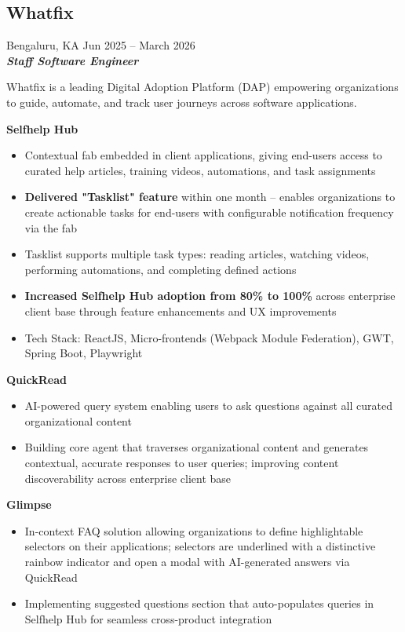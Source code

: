 \documentclass[10pt,a4paper]{article}
\begin{document}
\subsection*{\large Whatfix}
\textcolor{datecolor}{Bengaluru, KA \textbar Jun 2025 -- March 2026} \\
\textbf{\textit{Staff Software Engineer}}

Whatfix is a leading Digital Adoption Platform (DAP) empowering organizations to guide, automate, and track user journeys across software applications.

\textbf{Selfhelp Hub}
\begin{itemize}[leftmargin=*, nosep]
  \item Contextual fab embedded in client applications, giving end-users access to curated help articles, training videos, automations, and task assignments
  \item \textbf{Delivered "Tasklist" feature} within one month -- enables organizations to create actionable tasks for end-users with configurable notification frequency via the fab
  \item Tasklist supports multiple task types: reading articles, watching videos, performing automations, and completing defined actions
  \item \textbf{Increased Selfhelp Hub adoption from 80\% to 100\%} across enterprise client base through feature enhancements and UX improvements
  \item Tech Stack: ReactJS, Micro-frontends (Webpack Module Federation), GWT, Spring Boot, Playwright
\end{itemize}

\textbf{QuickRead}
\begin{itemize}[leftmargin=*, nosep]
  \item AI-powered query system enabling users to ask questions against all curated organizational content
  \item Building core agent that traverses organizational content and generates contextual, accurate responses to user queries; improving content discoverability across enterprise client base
\end{itemize}

\textbf{Glimpse}
\begin{itemize}[leftmargin=*, nosep]
  \item In-context FAQ solution allowing organizations to define highlightable selectors on their applications; selectors are underlined with a distinctive rainbow indicator and open a modal with AI-generated answers via QuickRead
  \item Implementing suggested questions section that auto-populates queries in Selfhelp Hub for seamless cross-product integration
\end{itemize}
\end{document}
